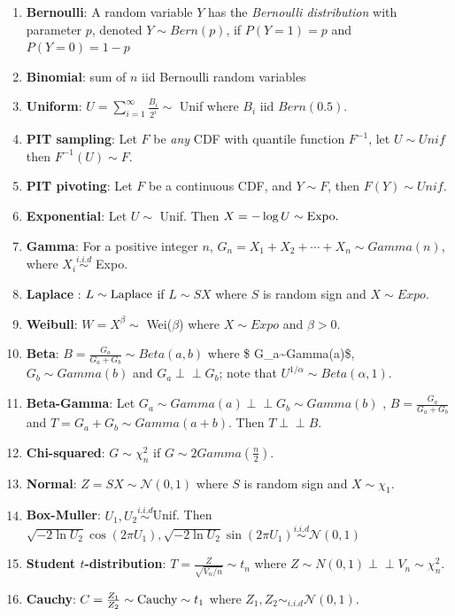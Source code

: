 \documentclass[
  letterpaper,
  DIV=11,
  numbers=noendperiod]{scrreprt}
\theoremstyle{plain}
\theoremstyle{definition}
\theoremstyle{remark}
\begin{document}
\begin{enumerate}
\def\labelenumi{\arabic{enumi}.}
\item
  \textbf{Bernoulli}: A random variable \(Y\) has the \emph{Bernoulli
  distribution} with parameter \(p\), denoted \(Y\sim Bern(p)\), if
  \(P(Y=1)=p\) and \(P(Y=0)=1-p\)
\item
  \textbf{Binomial}: sum of \(n\) iid Bernoulli random variables
\item
  \textbf{Uniform}: \(U = \sum_{i=1}^\infty \frac{B_i}{2^i} \sim\) Unif
  where \(B_i\) iid \(Bern(0.5)\).
\item
  \textbf{PIT sampling}: Let \(F\) be \textit{any} CDF with quantile
  function \(F^{-1}\), let \(U \sim Unif\) then \(F^{-1}(U) \sim F.\)
\item
  \textbf{PIT pivoting}: Let \(F\) be a continuous CDF, and
  \(Y \sim F\), then \(F(Y)\sim Unif.\)
\item
  \textbf{Exponential}: Let \(U\sim\) Unif. Then
  \(X = -\log U \sim \textnormal{Expo}.\)
\item
  \textbf{Gamma}: For a positive integer \(n\),
  \(G_n= X_1+X_2+\cdots + X_n \sim Gamma(n)\), where
  \(X_i \overset{i.i.d}{\sim}\) Expo.
\item
  \textbf{Laplace} : \(L \sim \textnormal{Laplace}\) if \(L \sim SX\)
  where \(S\) is random sign and \(X\sim Expo.\)
\item
  \textbf{Weibull}: \(W = X^\beta \sim\) Wei(\(\beta\)) where
  \(X \sim Expo\) and \(\beta >0.\)
\item
  \textbf{Beta}: \(B = \frac{G_a}{G_a+G_b} \sim Beta(a,b)\) where \$
  G\_a\sim Gamma(a)\$, \(G_b\sim Gamma(b)\) and
  \(G_a \perp\!\!\!\!\perp G_b\); note that
  \(U^{1/\alpha} \sim Beta(\alpha,1).\)
\item
  \textbf{Beta-Gamma}: Let
  \(G_a \sim Gamma(a) \perp\!\!\!\!\perp G_b\sim Gamma(b)\) ,
  \(B = \frac{G_a}{G_a+G_b}\) and \(T = G_a + G_b \sim Gamma(a+b).\)
  Then \(T \perp\!\!\!\!\perp B.\)
\item
  \textbf{Chi-squared}: \(G \sim \chi_n^2\) if
  \(G\sim 2Gamma\left(\frac{n}{2}\right).\)
\item
  \textbf{Normal}: \(Z = SX \sim \mathcal{N}(0,1)\) where \(S\) is
  random sign and \(X\sim \chi_1.\)
\item
  \textbf{Box-Muller}: \(U_1,U_2 \overset{i.i.d}{\sim}\)Unif. Then
  \(\sqrt{-2\ln U_2}\cos{(2\pi U_1)}, \sqrt{-2\ln U_2}\sin{(2\pi U_1)} \overset{i.i.d}{\sim} \mathcal{N}(0,1)\)
\item
  \textbf{Student \(t\)-distribution}:
  \(T = \frac{Z}{\sqrt{V_n/n}} \sim t_n\) where
  \(Z \sim N(0,1) \perp\!\!\!\!\perp V_n \sim \chi_n^2.\)
\item
  \textbf{Cauchy}:
  \(C = \frac{Z_1}{Z_2} \sim \textnormal{Cauchy} \sim t_1\) where
  \(Z_1,Z_2 \sim_{i.i.d} \mathcal{N}(0,1)\).
\end{enumerate}
\end{document}
